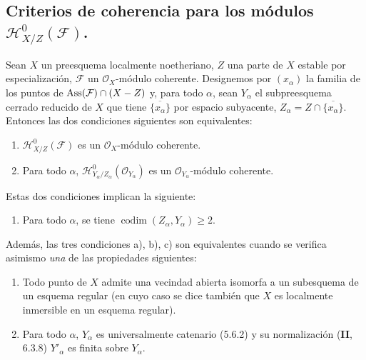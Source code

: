 \subsection{\texorpdfstring{Criterios de coherencia para los módulos
$\mathcal H^0_{X/Z}(\mathcal F)$.}{Criterios de coherencia para los módulos H\string^0\string_(F)}}

\begin{proposition}[5.11.1]
\label{IV.2.s5.11.1-fr}
Sean $X$ un preesquema localmente noetheriano, $Z$ una parte de $X$ estable por
especialización, $\mathcal F$ un $\mathcal O_X$-módulo coherente. Designemos por
$(x_\alpha)$ la familia de los puntos de
$\operatorname{Ass}(\mathcal F)\cap(X- Z)$ y, para todo $\alpha$, sean
$Y_\alpha$ el subpreesquema cerrado reducido de $X$ que tiene
$\overline{\{x_\alpha\}}$ por espacio subyacente,
$Z_\alpha=Z\cap\overline{\{x_\alpha\}}$. Entonces las dos condiciones siguientes
son equivalentes:
\begin{enumerate}
\item[\textup{a)}] $\mathcal H^0_{X/Z}(\mathcal F)$ es un $\mathcal O_X$-módulo
coherente.
\item[\textup{b)}] Para todo $\alpha$,
$\mathcal H^0_{Y_\alpha/Z_\alpha}(\mathcal O_{Y_\alpha})$ es un
$\mathcal O_{Y_\alpha}$-módulo coherente.
\end{enumerate}
Estas dos condiciones implican la siguiente:
\begin{enumerate}
\item[\textup{c)}] Para todo $\alpha$, se tiene
$\operatorname{codim}(Z_\alpha,Y_\alpha)\geq2$.
\end{enumerate}
Además, las tres condiciones \textup{a), b), c)} son equivalentes cuando se verifica
asimismo \emph{una} de las propiedades siguientes:
\begin{enumerate}
\item[\textup{(i)}] Todo punto de $X$ admite una vecindad abierta isomorfa a un
subesquema de un esquema regular \textup{(en cuyo caso se dice también que $X$ es}
localmente inmersible en un esquema regular\textup{)}.
\item[\textup{(ii)}] Para todo $\alpha$, $Y_\alpha$ es universalmente catenario
\textup{(5.6.2)} y su normalización \textup{(\textbf{II}, 6.3.8)} $Y'_\alpha$ es finita sobre $Y_\alpha$.
\end{enumerate}
\end{proposition}

